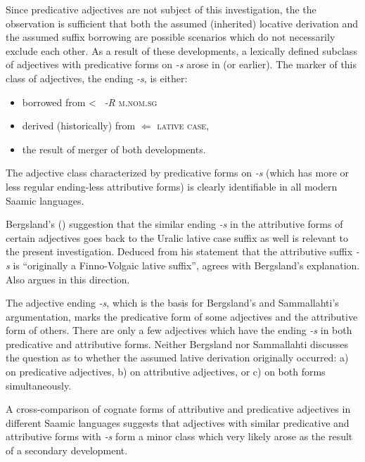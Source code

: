 {
Since predicative adjectives are not subject of this investigation, the the observation is sufficient that both the assumed (inherited) locative derivation and the assumed suffix borrowing are possible scenarios which do not necessarily exclude each other. As a result of these developments, a lexically defined subclass of adjectives with predicative forms on \textit{-s} arose in  (or earlier). The marker of this class of adjectives, the ending \textit{-s}, is either:
\begin{itemize}
\item borrowed from <~ \textit{-R} \textsc{m.nom.sg}
\item derived (historically) from $\Leftarrow$ \textsc{lative case}, %
\item the result of merger of both developments.
\end{itemize}

The adjective class characterized by predicative forms on \textit{-s} (which has more or less regular ending-less attributive forms) is clearly identifiable in all modern Saamic languages.

Bergsland's (\citeyear[96]{bergsland1946}) suggestion that the similar ending \textit{-s} in the attributive forms of certain adjectives goes back to the Uralic lative case suffix as well is relevant to the present investigation. Deduced from his statement that the attributive suffix \textit{-s} is “originally a Finno-Volgaic lative suffix”, \citet[71]{sammallahti1998b} agrees with Bergsland's explanation. Also \citet{judakin1997} argues in this direction.

The adjective ending \textit{-s}, which is the basis for Bergsland's and Sammallahti's argumentation, marks the predicative form of some adjectives and the attributive form of others. There are only a few adjectives which have the ending \textit{-s} in both predicative and attributive forms. Neither Bergsland nor Sammallahti discusses the question as to whether the assumed lative derivation originally occurred: a) on predicative adjectives, b) on attributive adjectives, or c) on both forms simultaneously.
 
A cross-comparison of cognate forms of attributive and predicative adjectives in different Saamic languages suggests that adjectives with similar predicative and attributive forms with \textit{-s} form a minor class which very likely arose as the result of a secondary development.

}
